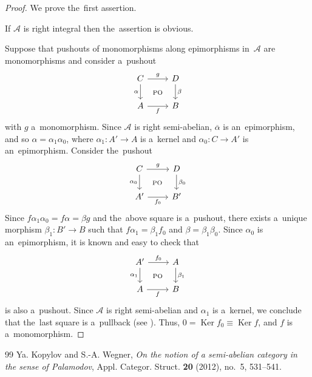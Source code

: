 \documentclass[10pt,a4paper]{amsart}
\newcommand{\Ker}{\operatorname{Ker}\nolimits}
\begin{document}
	\begin{proof}
		We prove the~first assertion.
		
		If $\mathcal{A}$ is right integral then the~assertion is obvious.
		
		Suppose that pushouts of monomorphisms along epimorphisms in~$\mathcal{A}$ are monomorphisms and consider a~pushout
		$$
		\begin{tikzcd}
			C \arrow[r, "g"] \arrow[d, "\alpha"'] & D \arrow[d, "\beta"] \\
			A \arrow[r, "f"'] & B
			\arrow[from=1-1, to=2-2, phantom, "\scriptstyle\text{PO}" description]
		\end{tikzcd}
		$$
		with $g$ a~monomorphism. Since $\mathcal{A}$ is right semi-abelian,
		$\overline{\alpha}$ is an~epimorphism, and so $\alpha=\alpha_1 \alpha_0$, where $\alpha_1:A'\to A$ is a~kernel and $\alpha_0:C\to A'$ is an~epimorphism. Consider the~pushout
		$$
		\begin{tikzcd}
			C \arrow[r, "g"] \arrow[d, "\alpha_0"'] & D \arrow[d, "\beta_0"] \\
			A' \arrow[r, "f_0"'] & B'
			\arrow[from=1-1, to=2-2, phantom, "\scriptstyle\text{PO}" description]
		\end{tikzcd}
		$$
		Since $f\alpha_1\alpha_0 = f\alpha = \beta g$ and the~above square
		is a~pushout, there exists a~unique morphism $\beta_1:B'\to B$ such that $f\alpha_1 = \beta_1 f_0$ and $\beta=\beta_1\beta_0$. Since $\alpha_0$ is an~epimorphism, it is known and easy to check that
		$$
		\begin{tikzcd}
			A' \arrow[r, "f_0"] \arrow[d, "\alpha_1"'] & A \arrow[d, "\beta_1"] \\
			A \arrow[r, "f"'] & B
			\arrow[from=1-1, to=2-2, phantom, "\scriptstyle\text{PO}" description]
		\end{tikzcd}
		$$
		is also a~pushout. Since $\mathcal{A}$ is right semi-abelian and $\alpha_1$ is a~kernel, we conclude that the~last square is a~pullback (see \cite[Proposition~3.1]{KW}). Thus, $0=\Ker f_0\equiv \Ker f$, and $f$ is a~monomorphism. 
	\end{proof}

\begin{thebibliography}{99}
 Ya. Kopylov and S.-A. Wegner, \emph{On the notion of a semi-abelian category in the sense of {P}alamodov}, Appl. Categor. Struct. \textbf{20} (2012), no.~5, 531--541.
\end{thebibliography}
\end{document}
